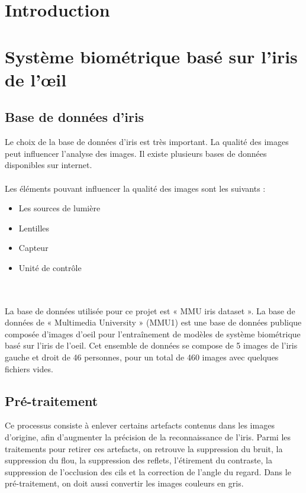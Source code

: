 \documentclass[12pt,twoside,letterpaper]{article}
\begin{document}



\tableofcontents
\newpage

\section{Introduction}
\cite{ref_01}

\section{Système biométrique basé sur l’iris de l’œil}

\subsection{Base de données d’iris}
Le choix de la base de données d’iris est très important. La qualité des images peut influencer l’analyse des images. Il existe plusieurs bases de données disponibles sur internet.
\\~\\
Les éléments pouvant influencer la qualité des images sont les suivants :
\begin{itemize}
    \item Les sources de lumière
    \item Lentilles
    \item Capteur
    \item Unité de contrôle
\end{itemize}
\ \\~\\
La base de données utilisée pour ce projet est « MMU iris dataset ». La base de données de « Multimedia University » (MMU1) est une base de données publique composée d'images d'oeil pour l'entraînement de modèles de système biométrique basé sur l'iris de l'oeil. Cet ensemble de données se compose de 5 images de l'iris gauche et droit de 46 personnes, pour un total de 460 images avec quelques fichiers vides.

\subsection{Pré-traitement}
Ce processus consiste à enlever certains artefacts contenus dans les images d’origine, afin d’augmenter la précision de la reconnaissance de l’iris. Parmi les traitements pour retirer ces artefacts, on retrouve la suppression du bruit, la suppression du flou, la suppression des reflets, l’étirement du contraste, la suppression de l’occlusion des cils et la correction de l'angle du regard. Dans le pré-traitement, on doit aussi convertir les images couleurs en gris.
\end{document}
